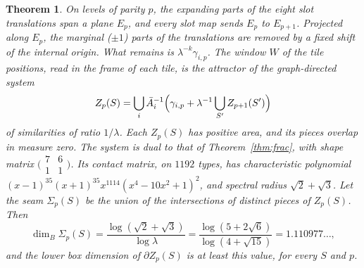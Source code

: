 \documentclass[11pt]{article}
\newtheorem{thm}{Theorem}
\theoremstyle{definition}
\theoremstyle{remark}
\newcommand{\lam}{\lambda}
\begin{document}
\begin{thm}
\label{thm:window}
On levels of parity $p$, the expanding parts of the eight slot translations span a plane $E_{p}$, and every slot map
sends $E_{p}$ to $E_{p+1}$.  Projected along $E_{p}$, the marginal ($\pm1$) parts of the translations are removed by a
fixed shift of the internal origin.  What remains is $\lam^{-k}\gamma_{i,p}$.  The window $W$ of the tile positions,
read in the frame of each tile, is the attractor of the graph-directed system
\[
Z_{p}(S)=\bigcup_{i}\bar A_{i}^{-1}\Bigl(\gamma_{i,p}+\lam^{-1}\bigcup_{S'}Z_{p+1}(S')\Bigr)
\]
of similarities of ratio $1/\lam$.  Each $Z_{p}(S)$ has positive area, and its pieces overlap in measure zero.  The
system is dual to that of Theorem~\ref{thm:frac}, with shape matrix
$\bigl(\begin{smallmatrix}7&6\\1&1\end{smallmatrix}\bigr)$.  Its contact matrix, on $1192$ types, has characteristic
polynomial $(x-1)^{35}(x+1)^{35}x^{1114}(x^{4}-10x^{2}+1)^{2}$, and spectral radius $\sqrt2+\sqrt3$.  Let the seam
$\Sigma_{p}(S)$ be the union of the intersections of distinct pieces of $Z_{p}(S)$.  Then
\[
\dim_{B}\Sigma_{p}(S)=\frac{\log(\sqrt2+\sqrt3)}{\log\lam}=\frac{\log(5+2\sqrt6)}{\log(4+\sqrt{15})}=1.110977\ldots,
\]
and the lower box dimension of $\partial Z_{p}(S)$ is at least this value, for every $S$ and $p$.
\end{thm}
\end{document}
